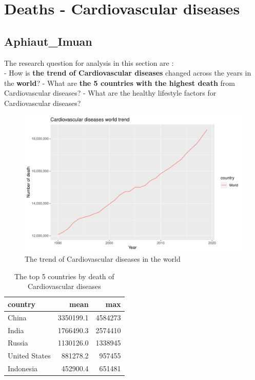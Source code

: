 \documentclass[11pt,a4paper,]{article}
\begin{document}
\section*{Deaths - Cardiovascular diseases}

\hypertarget{aphiaut_imuan-1}{%
\subsection{Aphiaut\_Imuan}\label{aphiaut_imuan-1}}

The research question for analysis in this section are :\\
- How is \textbf{the trend of Cardiovascular diseases} changed across the years in the \textbf{world}?
- What are \textbf{the 5 countries with the highest death} from Cardiovascular diseases?
- What are the healthy lifestyle factors for Cardiovascular diseases?

\begin{figure}[H]

{\centering \includegraphics[width=0.8\linewidth]{report_files/figure-latex/worldtrendcardio-1} 

}

\caption{The trend of Cardiovascular diseases in the world}\label{fig:worldtrendcardio}
\end{figure}

\begin{table}[!h]

\caption{\label{tab:tabletop5cardio}The top 5 countries by death of Cardiovascular diseases}
\centering
\begin{tabular}[t]{l|r|r}
\hline
country & mean & max\\
\hline
China & 3350199.1 & 4584273\\
\hline
India & 1766490.3 & 2574410\\
\hline
Russia & 1130126.0 & 1338945\\
\hline
United States & 881278.2 & 957455\\
\hline
Indonesia & 452900.4 & 651481\\
\hline
\end{tabular}
\end{table}
\end{document}
